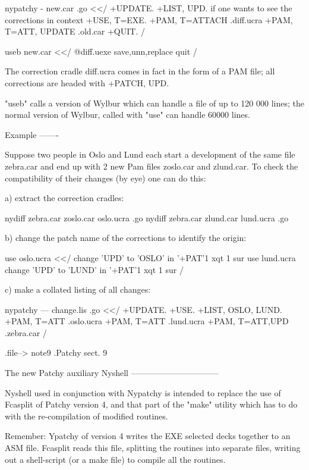    nypatchy  -  new.car  .go  <</
   +UPDATE.
   +LIST, UPD.  if one wants to see the corrections in context
   +USE, T=EXE.
   +PAM, T=ATTACH       .diff.ucra
   +PAM, T=ATT, UPDATE  .old.car
   +QUIT.
   /

   useb  new.car  <</
   @diff.uexe
   save,unn,replace
   quit
   /

The correction cradle diff.ucra comes in fact in the form of a
PAM file; all corrections are headed with +PATCH, UPD.

"useb" calls a version of Wylbur which can handle a file of
up to 120 000 lines; the normal version of Wylbur, called with
"use" can handle 60000 lines.

Example
-------

Suppose two people in Oslo and Lund each start a development of the
same file zebra.car and end up with 2 new Pam files zoslo.car and
zlund.car. To check the compatibility of their changes (by eye)
one can do this:

a) extract the correction cradles:

      nydiff zebra.car zoslo.car oslo.ucra .go
      nydiff zebra.car zlund.car lund.ucra .go

b) change the patch name of the corrections to identify the origin:

      use oslo.ucra   <</
      change 'UPD' to 'OSLO' in '+PAT'1 xqt 1
      sur
      use lund.ucra
      change 'UPD' to 'LUND' in '+PAT'1 xqt 1
      sur
      /

c) make a collated listing of all changes:

      nypatchy --- change.lis .go  <</
      +UPDATE.
      +USE.
      +LIST, OSLO, LUND.
      +PAM, T=ATT      .oslo.ucra
      +PAM, T=ATT      .lund.ucra
      +PAM, T=ATT,UPD  .zebra.car
      /

.file-->  note9
.Patchy sect. 9


               The new Patchy auxiliary Nyshell
               --------------------------------

Nyshell used in conjunction with Nypatchy is intended to replace the use
of Fcasplit of Patchy version 4, and that part of the "make" utility which
has to do with the re-compilation of modified routines.

Remember: Ypatchy of version 4 writes the EXE selected decks together to
an ASM file. Fcasplit reads this file, splitting the routines into
separate files, writing out a shell-script (or a make file) to compile
all the routines.

